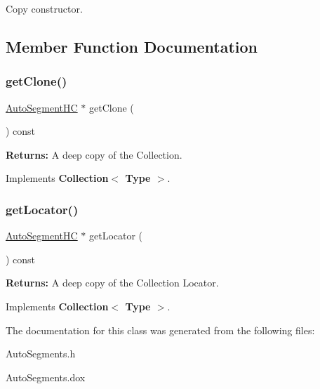 Copy constructor. 

\subsection{Member Function Documentation}
\mbox{\label{classKatabatic_1_1AutoSegments__AnchorOnGCell_a5b26b0698bdcb40cbf51b250dfb21858}} 
\subsubsection{\texorpdfstring{get\+Clone()}{getClone()}}
{\footnotesize\ttfamily \mbox{\hyperlink{namespaceKatabatic_acb3628dc7705fefe38a665cfe43efa6e}{Auto\+Segment\+HC}} $\ast$ get\+Clone (\begin{DoxyParamCaption}{ }\end{DoxyParamCaption}) const\hspace{0.3cm}{\ttfamily [virtual]}}

{\bfseries Returns\+:} A deep copy of the Collection. 

Implements \textbf{ Collection$<$ Type $>$}.

\mbox{\label{classKatabatic_1_1AutoSegments__AnchorOnGCell_a07665c070fcc269aec02ce842f384483}} 
\subsubsection{\texorpdfstring{get\+Locator()}{getLocator()}}
{\footnotesize\ttfamily \mbox{\hyperlink{namespaceKatabatic_acb3628dc7705fefe38a665cfe43efa6e}{Auto\+Segment\+HC}} $\ast$ get\+Locator (\begin{DoxyParamCaption}{ }\end{DoxyParamCaption}) const\hspace{0.3cm}{\ttfamily [virtual]}}

{\bfseries Returns\+:} A deep copy of the Collection Locator. 

Implements \textbf{ Collection$<$ Type $>$}.



The documentation for this class was generated from the following files\+:\begin{DoxyCompactItemize}
\item 
Auto\+Segments.\+h\item 
Auto\+Segments.\+dox\end{DoxyCompactItemize}

